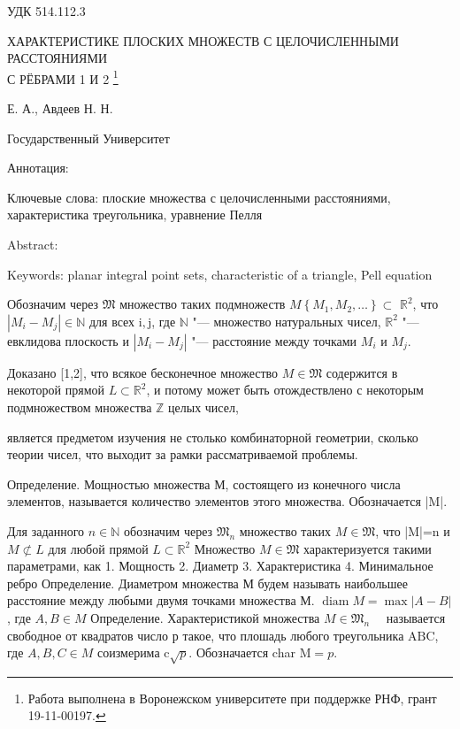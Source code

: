 \documentclass[a4paper,openbib]{article}
\begin{document}
\noindent УДК 514.112.3


\begin{center}
	 ХАРАКТЕРИСТИКЕ ПЛОСКИХ МНОЖЕСТВ С ЦЕЛОЧИСЛЕННЫМИ РАССТОЯНИЯМИ\\С РЁБРАМИ 1 И 2
	\footnote{
		Работа выполнена в Воронежском университете при поддержке РНФ, грант 19-11-00197.
	}

	 Е. А., Авдеев Н. Н.

	 Государственный Университет
\end{center}

Аннотация:

Ключевые слова:
	плоские множества с целочисленными расстояниями,
	характеристика треугольника,
	уравнение Пелля

Abstract:

Keywords:
	planar integral point sets,
	characteristic of a triangle,
	Pell equation




Обозначим через $\mathfrak{M}$ множество таких подмножеств $M\left\{M_{1}, M_{2}, \ldots\right\} \subset$ $\mathbb{R}^{2}$,
что $\left|M_{i}-M_{j}\right| \in \mathbb{N}$ для всех $\mathrm{i}, \mathrm{j}$,
где $\mathbb{N}$ "--- множество натуральных чисел,
$\mathbb{R}^2$ "--- евклидова плоскость
и $\left|M_{i}-M_{j}\right|$ "--- расстояние между точками $M_{i}$ и $M_{j}$.




Доказано [1,2], что всякое бесконечное множество $M \in \mathfrak{M}$ содержится в некоторой прямой $L \subset \mathbb{R}^{2}$,
и потому может быть отождествлено с некоторым подмножеством множества $\mathbb{Z}$ целых чисел,

является предметом изучения не столько комбинаторной геометрии,
сколько теории чисел, что выходит за рамки рассматриваемой проблемы.

Определение. Мощностью множества М, состоящего из конечного
числа элементов, называется количество элементов этого множества. Обозначается |M|.

Для заданного $n \in \mathbb{N}$ обозначим через $\mathfrak{M}_{n}$ множество таких $M \in \mathfrak{M}$, что |M|=n и $M \not \subset L$ для любой прямой $L \subset \mathbb{R}^{2}$ Множество $M \in \mathfrak{M}$ характеризуется такими параметрами, как
1. Мощность
2. Диаметр
3. Характеристика
4. Минимальное ребро Определение. Диаметром множества М будем называть наибольшее расстояние между любыми двумя точками множества М.
$\operatorname{diam} M=\max |A-B|$, где $A, B \in M$
Определение. Характеристикой множества $M \in \mathfrak{M}_{n} \quad$ называется свободное от квадратов число р такое, что плошадь любого треугольника $\mathrm{ABC}$, где $A, B, C \in M$ соизмерима $\mathrm{c} \sqrt{p} .$ Обозначается char $\mathrm{M}={p} .$
\end{document}
